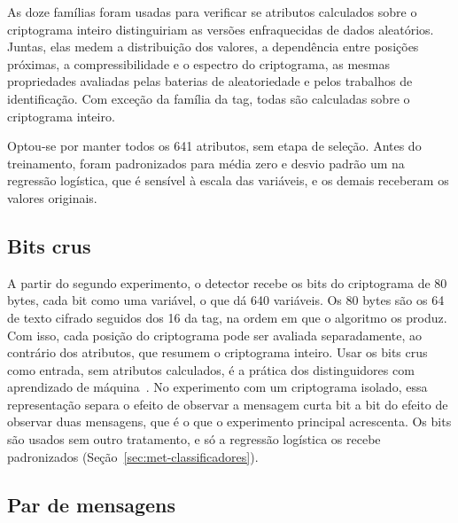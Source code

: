 As doze famílias foram usadas para verificar se atributos calculados sobre o criptograma inteiro distinguiriam as versões enfraquecidas de dados aleatórios. Juntas, elas medem a distribuição dos valores, a dependência entre posições próximas, a compressibilidade e o espectro do criptograma, as mesmas propriedades avaliadas pelas baterias de aleatoriedade e pelos trabalhos de identificação. Com exceção da família da tag, todas são calculadas sobre o criptograma inteiro.

Optou-se por manter todos os 641 atributos, sem etapa de seleção. Antes do treinamento, foram padronizados para média zero e desvio padrão um na regressão logística, que é sensível à escala das variáveis, e os demais receberam os valores originais.

\subsection{Bits crus}
\label{sec:met-bits}

A partir do segundo experimento, o detector recebe os bits do criptograma de 80 bytes, cada bit como uma variável, o que dá 640 variáveis. Os 80 bytes são os 64 de texto cifrado seguidos dos 16 da tag, na ordem em que o algoritmo os produz. Com isso, cada posição do criptograma pode ser avaliada separadamente, ao contrário dos atributos, que resumem o criptograma inteiro. Usar os bits crus como entrada, sem atributos calculados, é a prática dos distinguidores com aprendizado de máquina~\cite{gohr_2019}. No experimento com um criptograma isolado, essa representação separa o efeito de observar a mensagem curta bit a bit do efeito de observar duas mensagens, que é o que o experimento principal acrescenta. Os bits são usados sem outro tratamento, e só a regressão logística os recebe padronizados (Seção~\ref{sec:met-classificadores}).

\subsection{Par de mensagens}
\label{sec:met-par}

